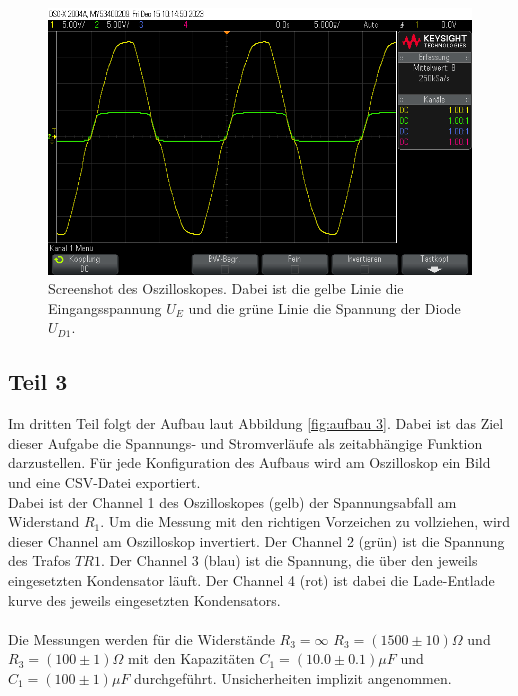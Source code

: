 \documentclass[12pt,a4paper,twoside]{article}
\begin{document}
\begin{figure}[H]
    \centering
    \includegraphics[width=0.6\linewidth]{nudes/Halbleiterdiode/Aufgabe2/a2b1___.png}
    \caption{Screenshot des Oszilloskopes. Dabei ist die gelbe Linie die Eingangsspannung $U_E$ und die grüne Linie die Spannung der Diode $U_{D1}$. }
    \label{fig:mess 2}
\end{figure}

\subsection{Teil 3}
Im dritten Teil folgt der Aufbau laut Abbildung \ref{fig:aufbau 3}. 
Dabei ist das Ziel dieser Aufgabe die Spannungs- und Stromverläufe als zeitabhängige Funktion darzustellen. 
Für jede Konfiguration des Aufbaus wird am Oszilloskop ein Bild und eine CSV-Datei exportiert. 
\\
Dabei ist der Channel 1 des Oszilloskopes (gelb) der Spannungsabfall am Widerstand $R_1$. 
Um die Messung mit den richtigen Vorzeichen zu vollziehen, wird dieser Channel am Oszilloskop invertiert. 
Der Channel 2 (grün) ist die Spannung des Trafos $TR1$. 
Der Channel 3 (blau) ist die Spannung, die über den jeweils eingesetzten Kondensator läuft. 
Der Channel 4 (rot) ist dabei die Lade-Entlade kurve des jeweils eingesetzten Kondensators. 
\\
\\
Die Messungen werden für die Widerstände $R_3 = \infty$ $R_3 = (1500 \pm 10) \Omega$ und $R_3 = (100 \pm 1) \Omega$ mit den Kapazitäten $C_1 = (10.0 \pm 0.1) \mu F$ und $C_1 = (100 \pm 1) \mu F $ durchgeführt. Unsicherheiten implizit angenommen. 
\end{document}
